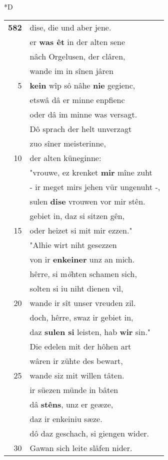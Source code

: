 \documentclass[8pt,a4paper,notitlepage]{article}
\begin{document}
\begin{table}[ht]
\begin{minipage}[t]{0.5\linewidth}
\small
\begin{center}*D
\end{center}
\begin{tabular}{rl}
\textbf{582} & dise, die und aber jene.\\ 
 & er \textbf{was êt} in der alten sene\\ 
 & nâch Orgelusen, der clâren,\\ 
 & wande im in sînen jâren\\ 
5 & \textbf{kein} wîp sô nâhe \textbf{nie} gegienc,\\ 
 & etswâ dâ er minne enpfienc\\ 
 & oder dâ im minne was versagt.\\ 
 & Dô sprach der helt unverzagt\\ 
 & zuo sîner meisterinne,\\ 
10 & der alten küneginne:\\ 
 & "vrouwe, ez krenket \textbf{mir} mîne zuht\\ 
 & - ir meget mirs jehen vür ungenuht -,\\ 
 & sulen \textbf{dise} vrouwen vor mir stên.\\ 
 & gebiet in, daz si sitzen gên,\\ 
15 & oder heizet si mit mir ezzen."\\ 
 & "Alhie wirt niht gesezzen\\ 
 & von ir \textbf{enkeiner} unz an mich.\\ 
 & hêrre, si m\textit{ö}hten schamen sich,\\ 
 & solten si iu niht dienen vil,\\ 
20 & wande ir sît unser vreuden zil.\\ 
 & doch, hêrre, swaz ir gebiet in,\\ 
 & daz \textbf{sulen si} leisten, hab \textbf{wir} sin."\\ 
 & Die edelen mit der hôhen art\\ 
 & wâren ir zühte des bewart,\\ 
25 & wande siz mit willen tâten.\\ 
 & ir süezen münde in bâten\\ 
 & dâ \textbf{stêns}, unz er geæze,\\ 
 & daz ir enkeiniu sæze.\\ 
 & dô daz geschach, si giengen wider.\\ 
30 & Gawan sich leite slâfen nider.\\ 

\end{tabular}
\end{minipage}
\end{table}
\end{document}
